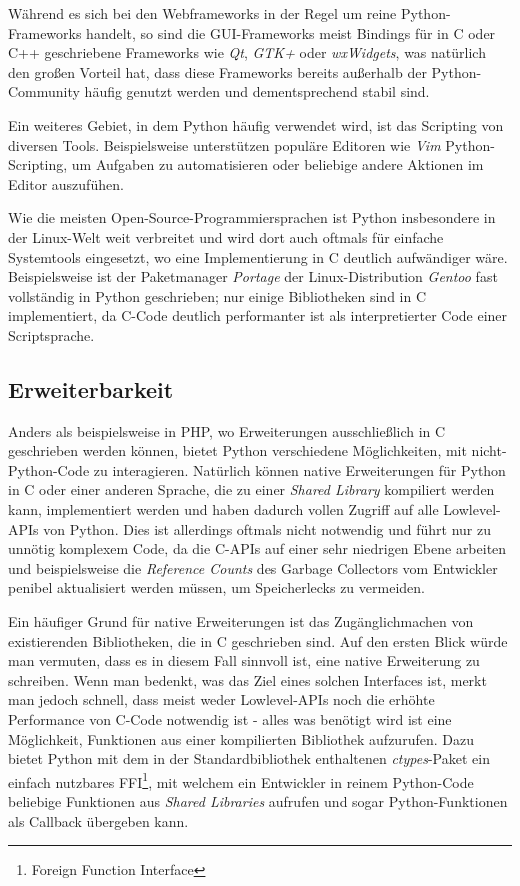 Während es sich bei den Webframeworks in der Regel um reine Python-Frameworks handelt, so sind die
GUI-Frameworks meist Bindings für in C oder C++ geschriebene Frameworks wie \emph{Qt}, \emph{GTK+}
oder \emph{wxWidgets}, was natürlich den großen Vorteil hat, dass diese Frameworks bereits außerhalb
der Python-Community häufig genutzt werden und dementsprechend stabil sind.

Ein weiteres Gebiet, in dem Python häufig verwendet wird, ist das Scripting von diversen Tools.
Beispielsweise unterstützen populäre Editoren wie \emph{Vim} Python-Scripting, um Aufgaben zu
automatisieren oder beliebige andere Aktionen im Editor auszufühen.

Wie die meisten Open-Source-Programmiersprachen ist Python insbesondere in der Linux-Welt weit
verbreitet und wird dort auch oftmals für einfache Systemtools eingesetzt, wo eine Implementierung
in C deutlich aufwändiger wäre. Beispielsweise ist der Paketmanager \emph{Portage} der
Linux-Distribution \emph{Gentoo} fast vollständig in Python geschrieben; nur einige Bibliotheken
sind in C implementiert, da C-Code deutlich performanter ist als interpretierter Code einer
Scriptsprache.


\subsection{Erweiterbarkeit}

Anders als beispielsweise in PHP, wo Erweiterungen ausschließlich in C geschrieben werden können,
bietet Python verschiedene Möglichkeiten, mit nicht-Python-Code zu interagieren. Natürlich können
native Erweiterungen für Python in C oder einer anderen Sprache, die zu einer \emph{Shared Library}
kompiliert werden kann, implementiert werden und haben dadurch vollen Zugriff auf alle Lowlevel-APIs
von Python. Dies ist allerdings oftmals nicht notwendig und führt nur zu unnötig komplexem Code, da
die C-APIs auf einer sehr niedrigen Ebene arbeiten und beispielsweise die \emph{Reference Counts}
des Garbage Collectors vom Entwickler penibel aktualisiert werden müssen, um Speicherlecks zu
vermeiden.

Ein häufiger Grund für native Erweiterungen ist das Zugänglichmachen von existierenden Bibliotheken,
die in C geschrieben sind. Auf den ersten Blick würde man vermuten, dass es in diesem Fall sinnvoll
ist, eine native Erweiterung zu schreiben. Wenn man bedenkt, was das Ziel eines solchen Interfaces
ist, merkt man jedoch schnell, dass meist weder Lowlevel-APIs noch die erhöhte Performance von
C-Code notwendig ist - alles was benötigt wird ist eine Möglichkeit, Funktionen aus einer
kompilierten Bibliothek aufzurufen. Dazu bietet Python mit dem in der Standardbibliothek enthaltenen
\emph{ctypes}-Paket ein einfach nutzbares FFI\footnote{Foreign Function Interface}, mit welchem ein
Entwickler in reinem Python-Code beliebige Funktionen aus \emph{Shared Libraries} aufrufen und sogar
Python-Funktionen als Callback übergeben kann.

